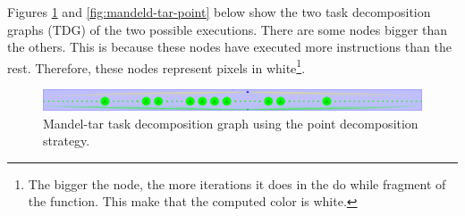 \documentclass[12pt, a4paper]{article}
\begin{document}
Figures \ref{fig:mandel-tar-point} and \ref{fig:mandeld-tar-point} below show the two task decomposition graphs (TDG) of the two possible executions. There are some nodes bigger than the others. This is because these nodes have executed more instructions than the rest. Therefore, these nodes represent pixels in white\footnote{The bigger the node, the more iterations it does in the do while fragment of the function. This make that the computed color is white.}.

\begin{figure}[H]
	\centering
	\includegraphics[scale=0.106]{./mandel-tar_point}
	\caption{Mandel-tar task decomposition graph using the point decomposition strategy.}
	\label{fig:mandel-tar-point}
\end{figure}
\end{document}
